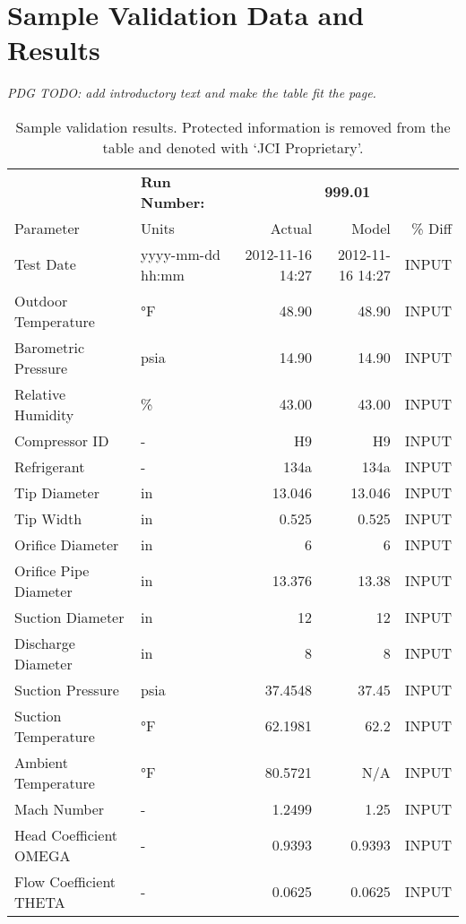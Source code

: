 \chapter{Sample Validation Data and Results} \label{app:sample}
\emph{PDG TODO: add introductory text and make the table fit the page.}

\begin{table}[htbp]
  \centering
  \caption{Sample validation results. Protected information
    is removed from the table and denoted with `JCI Proprietary'.}
  \label{tab:SampleData}%
    \begin{tabular}{llrrr}
    \addlinespace
    \toprule
          & \textbf{Run Number:} & \multicolumn{3}{c}{\textbf{999.01}} \\
    \cmidrule{3-5}
    Parameter & Units & Actual & Model & \% Diff \\
    \midrule
    Test Date & yyyy-mm-dd hh:mm & 2012-11-16 14:27 & 2012-11-16 14:27 & INPUT \\
    Outdoor Temperature & °F    & 48.90 & 48.90 & INPUT \\
    Barometric Pressure & psia  & 14.90 & 14.90 & INPUT \\
    Relative Humidity & \%    & 43.00 & 43.00 & INPUT \\
    Compressor ID & -     & H9    & H9    & INPUT \\
    Refrigerant & -     & 134a  & 134a  & INPUT \\
    Tip Diameter & in    & 13.046 & 13.046 & INPUT \\
    Tip Width & in    & 0.525 & 0.525 & INPUT \\
    Orifice Diameter & in    & 6     & 6     & INPUT \\
    Orifice Pipe Diameter & in    & 13.376 & 13.38 & INPUT \\
    Suction Diameter & in    & 12    & 12    & INPUT \\
    Discharge Diameter & in    & 8     & 8     & INPUT \\
    Suction Pressure & psia  & 37.4548 & 37.45 & INPUT \\
    Suction Temperature & °F    & 62.1981 & 62.2  & INPUT \\
    Ambient Temperature & °F    & 80.5721 & N/A   & INPUT \\
    Mach Number & -     & 1.2499 & 1.25  & INPUT \\
    Head Coefficient OMEGA & -     & 0.9393 & 0.9393 & INPUT \\
    Flow Coefficient THETA & -     & 0.0625 & 0.0625 & INPUT \\

\end{tabular}
\end{table}
